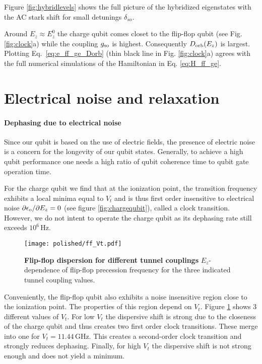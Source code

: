 Figure \ref{fig:hybridlevels} shows the full picture of the hybridized eigenstates with the AC stark shift for small detunings $\delta_{so}$. 

Around $E_z\approx E_z^0$ the charge qubit comes closet to the flip-flop qubit (see Fig. \ref{fig:clock}a) while the coupling $g_{\rm so}$ is highest. Consequently $D_{\rm orb}(E_z)$ is largest. Plotting Eq.~\eqref{eq:e_ff_ge_Dorb} (thin black line in Fig. \ref{fig:clock}a) agrees with the full numerical simulations of the Hamiltonian in Eq. \ref{eq:H_ff_ge}. 


\section{Electrical noise and relaxation} \label{sec:noise}

\paragraph{Dephasing due to electrical noise}

Since our qubit is based on the use of electric fields, the presence of electric noise is a concern for the longevity of our qubit states. Generally, to achieve a high qubit performance one needs a high ratio of qubit coherence time to qubit gate operation time. 

For the charge qubit we find that at the ionization point, the transition frequency exhibits a local minima equal to $V_t$ and is thus first order insensitive to electrical noise $\partial\epsilon_{\rm o}/\partial E_z=0$ (see figure \ref{fig:chargequbit}), called a clock transition. However, we do not intent to operate the charge qubit as its dephasing rate still exceeds $10^6\,$Hz. 

\begin{figure}[h]
	\centering
	\texttt{[image: polished/ff\_Vt.pdf]}
	\caption[Flip-flop dispersion for different tunnel couplings]{\textbf{Flip-flop dispersion for different tunnel couplings} $E_z$-dependence of flip-flop precession frequency for the three indicated tunnel coupling values.}
	\label{fig:ff_Vt}
\end{figure}


Conveniently, the flip-flop qubit also exhibits a noise insensitive region close to the ionization point. The properties of this region depend on $V_t$. Figure \ref{fig:ff_Vt} shows 3 different values of $V_t$. For low $V_t$ the dispersive shift is strong due to the closeness of the charge qubit and thus creates two first order clock transitions. These merge into one for $V_t=11.44\,$GHz. This creates a second-order clock transition and strongly reduces dephasing. Finally, for high $V_t$ the dispersive shift is not strong enough and does not yield a minimum. 


